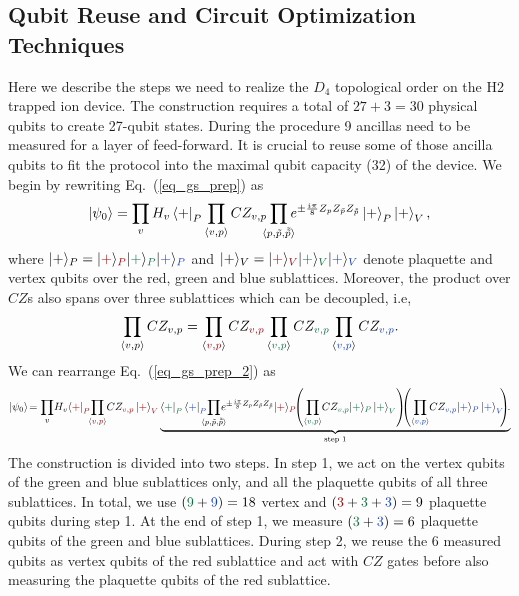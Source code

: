 \documentclass[nofootinbib,pra,twocolumn,showpacs,superscriptaddress,notitlepage,amsmath]{revtex4-2} %
\begin{document}
\subsection{Qubit Reuse and Circuit Optimization Techniques}
\label{appendix_circuit_optimisation}
Here we describe the steps we need to realize the $D_4$ topological order on  the H2 trapped ion device. The construction requires a total of $27+3=30$ physical qubits to create 27-qubit states.
During the procedure 9 ancillas need to be measured for a layer of feed-forward. It is crucial to reuse some of those ancilla qubits to fit the protocol into the maximal qubit capacity (32) of the device.
We begin by rewriting Eq.~(\ref{eq_gs_prep}) as
\begin{equation}	
	\ket{\psi_0} = \prod_v H_v \bra{+}_P  \prod_{\braket{v,p}} CZ_{v,p}
	\!\!\!\prod_{\langle p,{\tilde p},\tilde{\tilde p}\rangle}\!\!\! e^{\pm \frac{i \pi}{8} Z_{p}Z_{{\tilde p}}Z_{{\tilde{\tilde p}}}}  \ket{+}_{P}\ket{+}_V,
	\label{eq_gs_prep_2}
\end{equation}
where $|+\rangle_P = |\red{+}\rangle_{\red{P}} |\green{+}\rangle_{\green{P}} |\blue{+}\rangle_{\blue{P}}$ 
and $|+\rangle_V = |\red{+}\rangle_{\red{V}} |\green{+}\rangle_{\green{V}} |\blue{+}\rangle_{\blue{V}}$ denote plaquette and vertex qubits over the red, green and blue sublattices. Moreover, the product over $CZ$s also spans over three sublattices which can be decoupled, i.e,
$$\prod_{\braket{v,p}} CZ_{v,p}=\prod_{\braket{\red{v,p}}} CZ_{\red{v,p}} \prod_{\braket{\green{v,p}}} CZ_{\green{v,p}} \prod_{\braket{\blue{v,p}}} CZ_{\blue{v,p}}.$$ 
We can rearrange Eq.~(\ref{eq_gs_prep_2}) as 
\begin{equation}	
	\ket{\psi_0}\! = \prod_v\! H_v \!
	\bra{\red{+}}_{\red{P}}\!\!  \prod_{\braket{\red{v,p}}}\! CZ_{\red{v,p}} \ket{\red{+}}_{\red{V}}
	\underbrace{
	\bra{\green{+}}_{\green{P}} \bra{\blue{+}}_{\blue{P}}\!\!\!\!
	\prod_{\langle p,{\tilde p},{\tilde{\tilde p}}\rangle}\!\!\!\! e^{\pm \frac{i \pi}{8} Z_{p}Z_{{\tilde p}}Z_{{\tilde {\tilde p}}}}  |\red{+}\rangle_{\red{P}}\!\!
	\left(\prod_{\braket{\green{v,p}}}\! CZ_{\green{v,p}}  |\green{+}\rangle_{\green{P}} \ket{\green{+}}_{\green{V}} \right)\!\!\!
	\left(\prod_{\braket{\blue{v,p}}}\! CZ_{\blue{v,p}}|\blue{+}\rangle_{\blue{P}}\ket{\blue{+}}_{\blue{V}}
	\!\!\right)\!\!.
	}_{\text{step 1}}
	\label{eq_gs_prep_3}
\end{equation}
The construction is divided into two steps. In step 1, we act on the vertex qubits of the green and blue sublattices only, and all the plaquette qubits of all three sublattices.
In total, we use $(\green{9}+\blue{9})=18$ vertex and $(\red{3}+\green{3}+\blue{3})=9$ plaquette qubits during step 1. At the end of step 1, we measure $(\green{3}+\blue{3})=6$ plaquette qubits of the green and blue sublattices. During step 2, we reuse the 6 measured qubits as vertex qubits of the red sublattice and act with $CZ$ gates before also measuring the plaquette qubits of the red sublattice.
\end{document}
